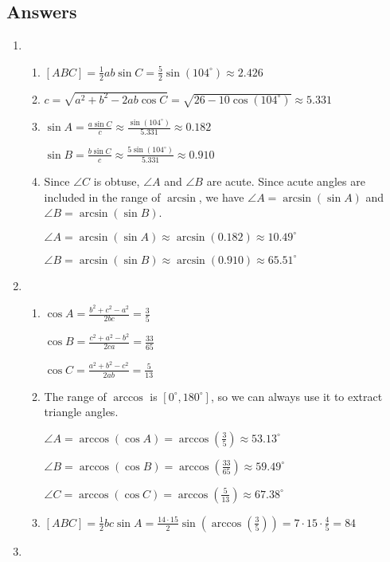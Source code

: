 \newpage
\subsection{Answers}

\begin{enumerate}
\item \begin{enumerate}
\item $[ABC] = \frac{1}{2}ab\sin C = \frac{5}{2}\sin(104^{\circ})\approx 2.426$
\item $c = \sqrt{a^2 + b^2 - 2ab\cos C} = \sqrt{26 - 10\cos(104^{\circ})}\approx 5.331$
\item $\sin A = \frac{a\sin C}{c}\approx\frac{\sin(104^{\circ})}{5.331}\approx 0.182$\par
$\sin B = \frac{b\sin C}{c}\approx\frac{5\sin(104^{\circ})}{5.331}\approx 0.910$
\item Since $\angle C$ is obtuse, $\angle A$ and $\angle B$ are acute. Since acute angles are included in the range of $\arcsin$, we have $\angle A = \arcsin(\sin A)$ and $\angle B = \arcsin(\sin B)$.\par
$\angle A = \arcsin(\sin A)\approx\arcsin(0.182)\approx 10.49^{\circ}$\par 
$\angle B = \arcsin(\sin B)\approx\arcsin(0.910)\approx 65.51^{\circ}$
\end{enumerate}
\item \begin{enumerate}
\item $\cos A = \frac{b^2 + c^2 - a^2}{2bc} = \frac{3}{5}$\par
$\cos B = \frac{c^2 + a^2 - b^2}{2ca} = \frac{33}{65}$\par
$\cos C = \frac{a^2 + b^2 - c^2}{2ab} = \frac{5}{13}$
\item The range of $\arccos$ is $[0^{\circ}, 180^{\circ}]$, so we can always use it to extract triangle angles.\par
$\angle A = \arccos(\cos A) = \arccos(\frac{3}{5})\approx 53.13^{\circ}$\par
$\angle B = \arccos(\cos B) = \arccos(\frac{33}{65})\approx 59.49^{\circ}$\par
$\angle C = \arccos(\cos C) = \arccos(\frac{5}{13})\approx 67.38^{\circ}$
\item $[ABC] = \frac{1}{2}bc\sin A = \frac{14\cdot 15}{2}\sin(\arccos(\frac{3}{5})) = 7\cdot 15\cdot\frac{4}{5} = 84$
\end{enumerate}
\item \begin{enumerate}

\end{enumerate}
\end{enumerate}
